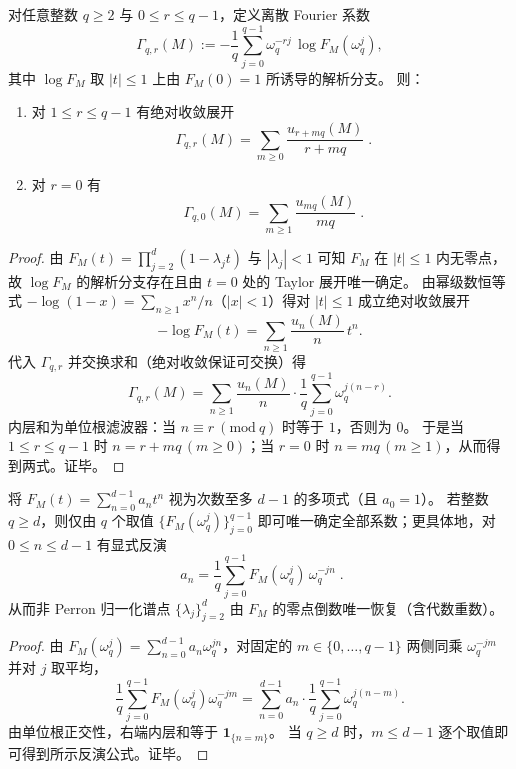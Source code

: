 \begin{proposition}\label{prop:finite-part-cyclic-lift-root-unity-fourier-sieve}
对任意整数 \(q\ge 2\) 与 \(0\le r\le q-1\)，定义离散 Fourier 系数
\[
\Gamma_{q,r}(M):=-\frac{1}{q}\sum_{j=0}^{q-1}\omega_q^{-rj}\,\log F_M(\omega_q^j),
\]
其中 \(\log F_M\) 取 \(|t|\le 1\) 上由 \(F_M(0)=1\) 所诱导的解析分支。
则：
\begin{enumerate}
  \item 对 \(1\le r\le q-1\) 有绝对收敛展开
  \[
  \boxed{\;
  \Gamma_{q,r}(M)=\sum_{m\ge 0}\frac{u_{r+mq}(M)}{r+mq}\; }.
  \]
  \item 对 \(r=0\) 有
  \[
  \boxed{\;
  \Gamma_{q,0}(M)=\sum_{m\ge 1}\frac{u_{mq}(M)}{mq}\; }.
  \]
\end{enumerate}
\end{proposition}
\begin{proof}
由 \(F_M(t)=\prod_{j=2}^{d}(1-\lambda_j t)\) 与 \(|\lambda_j|<1\) 可知 \(F_M\) 在 \(|t|\le 1\) 内无零点，故 \(\log F_M\) 的解析分支存在且由 \(t=0\) 处的 Taylor 展开唯一确定。
由幂级数恒等式 \(-\log(1-x)=\sum_{n\ge 1}x^n/n\)（\(|x|<1\)）得对 \(|t|\le 1\) 成立绝对收敛展开
\[
-\log F_M(t)=\sum_{n\ge 1}\frac{u_n(M)}{n}\,t^n.
\]
代入 \(\Gamma_{q,r}\) 并交换求和（绝对收敛保证可交换）得
\[
\Gamma_{q,r}(M)=\sum_{n\ge 1}\frac{u_n(M)}{n}\cdot \frac{1}{q}\sum_{j=0}^{q-1}\omega_q^{j(n-r)}.
\]
内层和为单位根滤波器：当 \(n\equiv r\ (\mathrm{mod}\ q)\) 时等于 \(1\)，否则为 \(0\)。
于是当 \(1\le r\le q-1\) 时 \(n=r+mq\,(m\ge 0)\)；当 \(r=0\) 时 \(n=mq\,(m\ge 1)\)，从而得到两式。证毕。
\end{proof}

\begin{theorem}\label{thm:finite-part-cyclic-lift-single-q-torsion-reconstruction}
将
\(
F_M(t)=\sum_{n=0}^{d-1}a_n t^n
\)
视为次数至多 \(d-1\) 的多项式（且 \(a_0=1\)）。
若整数 \(q\ge d\)，则仅由 \(q\) 个取值 \(\{F_M(\omega_q^j)\}_{j=0}^{q-1}\) 即可唯一确定全部系数；更具体地，对 \(0\le n\le d-1\) 有显式反演
\[
\boxed{\;
a_n=\frac{1}{q}\sum_{j=0}^{q-1}F_M(\omega_q^j)\,\omega_q^{-jn}\; }.
\]
从而非 Perron 归一化谱点 \(\{\lambda_j\}_{j=2}^{d}\) 由 \(F_M\) 的零点倒数唯一恢复（含代数重数）。
\end{theorem}
\begin{proof}
由 \(F_M(\omega_q^j)=\sum_{n=0}^{d-1}a_n\omega_q^{jn}\)，对固定的 \(m\in\{0,\dots,q-1\}\) 两侧同乘 \(\omega_q^{-jm}\) 并对 \(j\) 取平均，
\[
\frac{1}{q}\sum_{j=0}^{q-1}F_M(\omega_q^j)\omega_q^{-jm}
=\sum_{n=0}^{d-1}a_n\cdot \frac{1}{q}\sum_{j=0}^{q-1}\omega_q^{j(n-m)}.
\]
由单位根正交性，右端内层和等于 \(\mathbf{1}_{\{n=m\}}\)。
当 \(q\ge d\) 时，\(m\le d-1\) 逐个取值即可得到所示反演公式。证毕。
\end{proof}

